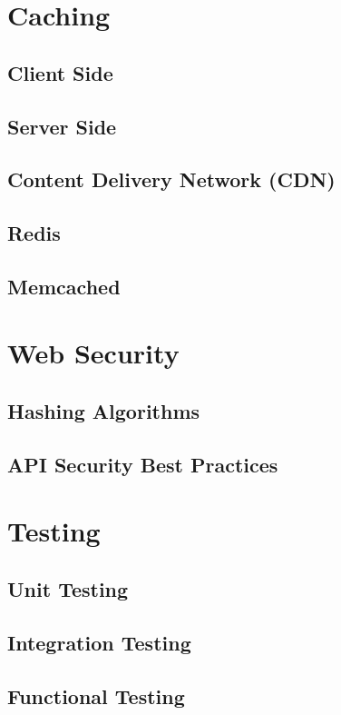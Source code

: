\documentclass[a4paper]{article}
\begin{document}
    

    \newpage
    \section{Caching}
    \subsection{Client Side}
    \subsection{Server Side}
    \subsection{Content Delivery Network (CDN)}
    \subsection{Redis}
    \subsection{Memcached}

    \newpage
    \section{Web Security}
    \subsection{Hashing Algorithms}
    \subsection{API Security Best Practices}

    \newpage
    \section{Testing}
    \subsection{Unit Testing}
    \subsection{Integration Testing}
    \subsection{Functional Testing}
    
\end{document}
